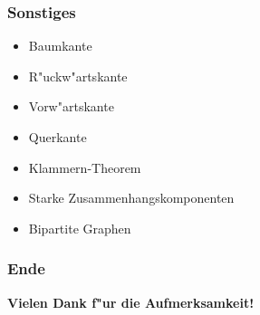\documentclass{beamer}
\begin{document}
\begin{frame}
\frametitle{Sonstiges}
\begin{block}{}
\begin{itemize}
\item Baumkante
\item R"uckw"artskante
\item Vorw"artskante
\item Querkante
\item Klammern-Theorem
\item Starke Zusammenhangskomponenten
\item Bipartite Graphen
\end{itemize}
\end{block}
\end{frame}


\begin{frame}
\frametitle{Ende}
\begin{center}
\textbf{\Huge Vielen Dank f"ur die Aufmerksamkeit!}
\end{center}
\end{frame}
\end{document}

